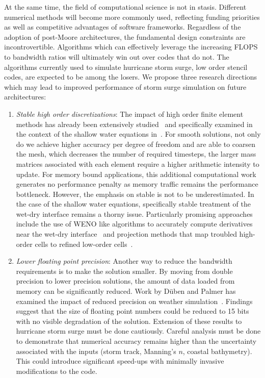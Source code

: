 At the same time, the field of computational science is not in stasis. Different numerical methods will become more commonly used, reflecting funding priorities as well as competitive advantages of software frameworks. Regardless of the adoption of post-Moore architectures, the fundamental design constraints are incontrovertible. Algorithms which can effectively leverage the increasing FLOPS to bandwidth ratios will ultimately win out over codes that do not. The algorithms currently used to simulate hurricane storm surge, low order stencil codes, are expected to be among the losers. We propose three research directions which may lead to improved performance of storm surge simulation on future architectures:
\begin{enumerate}
\item {\em Stable high order discretizations}:
  The impact of high order finite element methods has already been extensively studied~\cite{Swirydowicz2019, Fischer2020, Friedrich2019, Breuer2016, Uphoff2017, Pazner2018} and specifically examined in the context of the shallow water equations in~\cite{Gandham2015, Wintermeyer2018, Brus2017, Brus2019, Marras2018, Bonev2018}. For smooth solutions, not only do we achieve higher accuracy per degree of freedom and are able to coarsen the mesh, which decreases the number of required timesteps, the larger mass matrices associated with each element require a higher arithmetic intensity to update. For memory bound applications, this additional computational work generates no performance penalty as memory traffic remains the performance bottleneck.
  However, the emphasis on stable is not to be underestimated. In the case of the shallow water equations, specifically stable treatment of the wet-dry interface remains a thorny issue. Particularly promising approaches include the use of WENO like algorithms to accurately compute derivatives near the wet-dry interface~\cite{Bonev2018} and projection methods that map troubled high-order cells to refined low-order cells~\cite{Rannabauer2018}.
\item {\em Lower floating point precision}: Another way to reduce the bandwidth requirements is to make the solution smaller. By moving from double precision to lower precision solutions, the amount of data loaded from memory can be significantly reduced. Work by D\"{u}ben and Palmer has examined the impact of reduced precision on weather simulation~\cite{Dueben2014}. Findings suggest that the size of floating point numbers could be reduced to 15 bits with no visible degradation of the solution. Extension of these results to hurricane storm surge must be done cautiously. Careful analysis must be done to demonstrate that numerical accuracy remains higher than the uncertainty associated with the inputs (storm track, Manning's $n$, coastal bathymetry). This could introduce significant speed-ups with minimally invasive modifications to the code.

\end{enumerate}
